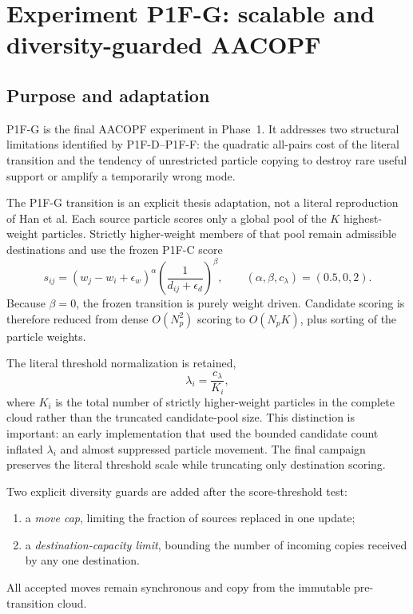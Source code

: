 \section{Experiment P1F-G: scalable and diversity-guarded AACOPF}
\subsection{Purpose and adaptation}
P1F-G is the final AACOPF experiment in Phase~1. It addresses two structural limitations identified by P1F-D--P1F-F: the quadratic all-pairs cost of the literal transition and the tendency of unrestricted particle copying to destroy rare useful support or amplify a temporarily wrong mode.

The P1F-G transition is an explicit thesis adaptation, not a literal reproduction of Han et al. Each source particle scores only a global pool of the \(K\) highest-weight particles. Strictly higher-weight members of that pool remain admissible destinations and use the frozen P1F-C score
\begin{equation}
    s_{ij}
    =
    \left(w_j-w_i+\epsilon_w\right)^{\alpha}
    \left(\frac{1}{d_{ij}+\epsilon_d}\right)^{\beta},
    \qquad
    (\alpha,\beta,c_\lambda)=(0.5,0,2).
\end{equation}
Because \(\beta=0\), the frozen transition is purely weight driven. Candidate scoring is therefore reduced from dense \(O(N_p^2)\) scoring to \(O(N_pK)\), plus sorting of the particle weights.

The literal threshold normalization is retained,
\begin{equation}
    \lambda_i=\frac{c_\lambda}{K_i},
\end{equation}
where \(K_i\) is the total number of strictly higher-weight particles in the complete cloud rather than the truncated candidate-pool size. This distinction is important: an early implementation that used the bounded candidate count inflated \(\lambda_i\) and almost suppressed particle movement. The final campaign preserves the literal threshold scale while truncating only destination scoring.

Two explicit diversity guards are added after the score-threshold test:
\begin{enumerate}
    \item a \emph{move cap}, limiting the fraction of sources replaced in one update;
    \item a \emph{destination-capacity limit}, bounding the number of incoming copies received by any one destination.
\end{enumerate}
All accepted moves remain synchronous and copy from the immutable pre-transition cloud.

